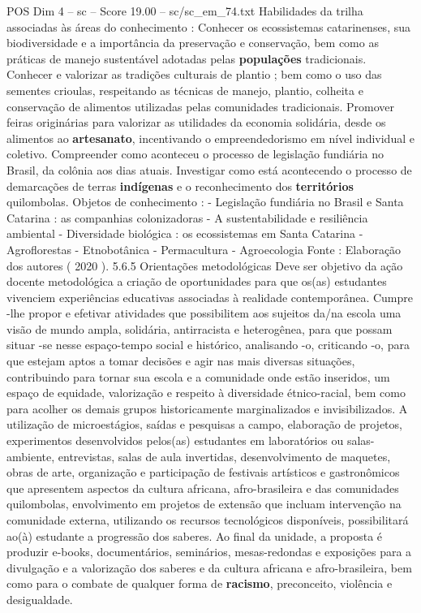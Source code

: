 \begin{textsample}{POS Dim 4 – sc – Score 19.00 – sc/sc\_em\_74.txt}
Habilidades da trilha associadas às áreas do conhecimento : Conhecer os ecossistemas catarinenses, sua biodiversidade e a importância da preservação e conservação, bem como as práticas de manejo sustentável adotadas pelas \textbf{populações} tradicionais.
Conhecer e valorizar as tradições culturais de plantio ; bem como o uso das sementes crioulas, respeitando as técnicas de manejo, plantio, colheita e conservação de alimentos utilizadas pelas comunidades tradicionais.
Promover feiras originárias para valorizar as utilidades da economia solidária, desde os alimentos ao \textbf{artesanato}, incentivando o empreendedorismo em nível individual e coletivo.
Compreender como aconteceu o processo de legislação fundiária no Brasil, da colônia aos dias atuais.
Investigar como está acontecendo o processo de demarcações de terras \textbf{indígenas} e o reconhecimento dos \textbf{territórios} quilombolas.
Objetos de conhecimento : - Legislação fundiária no Brasil e Santa Catarina : as companhias colonizadoras - A sustentabilidade e resiliência ambiental - Diversidade biológica : os ecossistemas em Santa Catarina - Agroflorestas - Etnobotânica - Permacultura - Agroecologia Fonte : Elaboração dos autores ( 2020 ). 5.6.5 Orientações metodológicas Deve ser objetivo da ação docente metodológica a criação de oportunidades para que os(as) estudantes vivenciem experiências educativas associadas à realidade contemporânea.
Cumpre -lhe propor e efetivar atividades que possibilitem aos sujeitos da/na escola uma visão de mundo ampla, solidária, antirracista e heterogênea, para que possam situar -se nesse espaço-tempo social e histórico, analisando -o, criticando -o, para que estejam aptos a tomar decisões e agir nas mais diversas situações, contribuindo para tornar sua escola e a comunidade onde estão inseridos, um espaço de equidade, valorização e respeito à diversidade étnico-racial, bem como para acolher os demais grupos historicamente marginalizados e invisibilizados.
A utilização de microestágios, saídas e pesquisas a campo, elaboração de projetos, experimentos desenvolvidos pelos(as) estudantes em laboratórios ou salas-ambiente, entrevistas, salas de aula invertidas, desenvolvimento de maquetes, obras de arte, organização e participação de festivais artísticos e gastronômicos que apresentem aspectos da cultura africana, afro-brasileira e das comunidades quilombolas, envolvimento em projetos de extensão que incluam intervenção na comunidade externa, utilizando os recursos tecnológicos disponíveis, possibilitará ao(à) estudante a progressão dos saberes.
Ao final da unidade, a proposta é produzir e-books, documentários, seminários, mesas-redondas e exposições para a divulgação e a valorização dos saberes e da cultura africana e afro-brasileira, bem como para o combate de qualquer forma de \textbf{racismo}, preconceito, violência e desigualdade.

\end{textsample}
